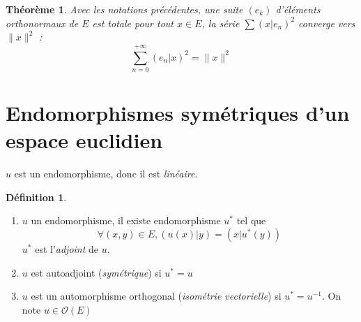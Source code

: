 \documentclass[11pt,a4paper]{report}
\newtheorem{itheorem}[theorem]{Théorème}
\theoremstyle{definition}
\newtheorem{dfn}[theorem]{Définition}
\begin{document}
\begin{itheorem}
     Avec les notations précédentes, une suite $(e_k)$ d'éléments orthonormaux de $E$ est totale \Longleftrightarrow pour tout $x\in E$, la série $\sum (x|e_n)^2$ converge vers $\| x \|^2$ : 
     \begin{equation}
     \sum_{n=0}^{+\infty} (e_n|x)^2 = \| x \|^2
     \end{equation}
\end{itheorem}

\section{Endomorphismes symétriques d'un espace euclidien}
$u$ est un endomorphisme, donc il est \emph{linéaire}.
\begin{dfn}
    \renewcommand{\theenumi}{\roman{enumi}}%
    \begin{enumerate}
        \item $u$ un endomorphisme, il existe  endomorphisme $u^*$ tel que
        \begin{equation*}
            \forall (x,y) \in E, (u(x)|y) = (x | u^*(y))
        \end{equation*}
        $u^*$ est l'\emph{adjoint} de $u$.
        \item $u$ est autoadjoint (\emph{symétrique}) si $u^* = u$ 
        \item $u$ est un automorphisme orthogonal (\emph{isométrie vectorielle}) si $u^* = u^{-1}$. On note $u \in \mathcal{O}(E)$
    \end{enumerate}
\end{dfn}
\end{document}
